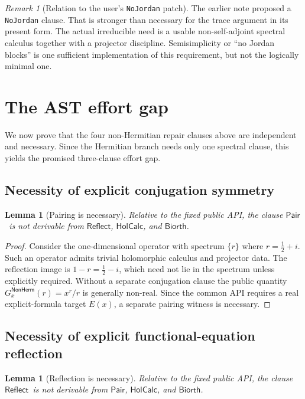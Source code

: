 \documentclass[11pt,a4paper]{article}
\theoremstyle{plain}
\newtheorem{lemma}[theorem]{Lemma}
\theoremstyle{definition}
\theoremstyle{remark}
\newtheorem{remark}[theorem]{Remark}
\newcommand{\pair}{\ensuremath{\mathsf{Pair}}}
\newcommand{\reflect}{\ensuremath{\mathsf{Reflect}}}
\newcommand{\holcalc}{\ensuremath{\mathsf{HolCalc}}}
\newcommand{\biorth}{\ensuremath{\mathsf{Biorth}}}
\newcommand{\nonherm}{\ensuremath{\mathsf{NonHerm}}}
\begin{document}
\begin{remark}[Relation to the user's \texttt{NoJordan} patch]
The earlier note proposed a \texttt{NoJordan} clause. That is stronger than necessary for the trace argument in its present form. The actual irreducible need is a usable non-self-adjoint spectral calculus together with a projector discipline. Semisimplicity or ``no Jordan blocks'' is one sufficient implementation of this requirement, but not the logically minimal one.
\end{remark}

\section{The AST effort gap}

We now prove that the four non-Hermitian repair clauses above are independent and necessary. Since the Hermitian branch needs only one spectral clause, this yields the promised three-clause effort gap.

\subsection{Necessity of explicit conjugation symmetry}

\begin{lemma}[Pairing is necessary]
\label{lem:pair-necessary}
Relative to the fixed public API, the clause \pair\ is not derivable from \reflect, \holcalc, and \biorth.
\end{lemma}

\begin{proof}
Consider the one-dimensional operator with spectrum $\{r\}$ where $r=\frac12+i$. Such an operator admits trivial holomorphic calculus and projector data. The reflection image is $1-r=\frac12-i$, which need not lie in the spectrum unless explicitly required. Without a separate conjugation clause the public quantity $G_x^{\nonherm}(r)=x^r/r$ is generally non-real. Since the common API requires a real explicit-formula target $E(x)$, a separate pairing witness is necessary.
\end{proof}

\subsection{Necessity of explicit functional-equation reflection}

\begin{lemma}[Reflection is necessary]
\label{lem:reflect-necessary}
Relative to the fixed public API, the clause \reflect\ is not derivable from \pair, \holcalc, and \biorth.
\end{lemma}
\end{document}
